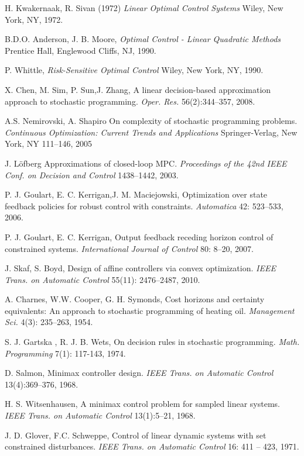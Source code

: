 \documentclass[letterpaper,11pt]{article}
\begin{document}
\begin{thebibliography}{1}
H. Kwakernaak, R. Sivan  (1972)
{\it Linear Optimal Control Systems} 
Wiley, New York, NY, 1972.

B.D.O. Anderson, J. B. Moore,   
{\it  Optimal Control - Linear Quadratic Methods} 
Prentice Hall, Englewood Cliffs, NJ, 1990.

P. Whittle, 
{\it Risk-Sensitive Optimal Control} 
Wiley, New York, NY, 1990.

X. Chen, M.  Sim, P. Sun,J. Zhang,
A linear decision-based approximation approach to stochastic programming.
{\it Oper. Res.} 56(2):344--357, 2008.

A.S. Nemirovski, A. Shapiro 
On complexity of stochastic programming problems.
{\it Continuous Optimization: Current Trends and Applications}  
Springer-Verlag, New York, NY  111--146, 2005


J. L{\"o}fberg 
Approximations of closed-loop MPC. 
{\it Proceedings of the 42nd IEEE Conf. on Decision and Control} 1438--1442, 2003.

P. J. Goulart, E. C. Kerrigan,J. M.  Maciejowski,
Optimization over state feedback policies for robust control with constraints.
{\it Automatica} 42: 523--533, 2006.

P. J. Goulart, E. C. Kerrigan,
Output feedback receding horizon control of constrained systems.
{\it International Journal of Control} 80: 8--20, 2007.

J. Skaf, S. Boyd, 
Design of affine controllers via convex optimization.
{\it IEEE Trans. on Automatic Control} 55(11): 2476--2487, 2010.

A. Charnes, W.W. Cooper, G. H. Symonds,
Cost horizons and certainty equivalents: An approach to stochastic programming of heating oil.
{\it Management Sci.} 4(3): 235--263, 1954.

S. J. Gartska , R. J. B. Wets,
On decision rules in stochastic programming.
{\it Math. Programming} 7(1): 117-143, 1974.

D. Salmon,  
Minimax controller design. 
{\it IEEE Trans. on Automatic Control} 13(4):369--376, 1968.

H. S. Witsenhausen, 
A minimax control problem for sampled linear systems. 
{\it IEEE Trans. on Automatic Control} 13(1):5--21, 1968.

J. D. Glover, F.C. Schweppe, 
Control of linear dynamic systems with set constrained disturbances.
{\it IEEE Trans. on Automatic Control} 16: 411 -- 423, 1971.


\end{thebibliography}
\end{document}
